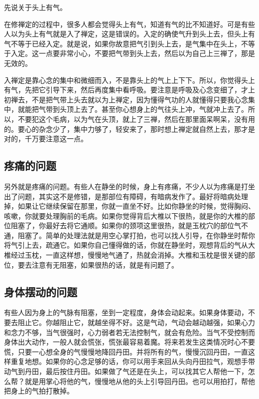 \documentclass{book}
\begin{document}
先说关于头上有气。

在修禅定的过程中，很多人都会觉得头上有气，知道有气的比不知道好。可是有些人以为头上有气就是入了禅定，这是错误的。入定的确使气升到头上去，但头上有气不等于已经入定。就是说，如果你故意把气引到头上去，是气集中在头上，不等于入定。这一点要非常小心，不要把气带到头上去，然后以为自己上三禅了，那是无效的。

入禅定是靠心念的集中和微细而入，不是靠头上的气上上下下。所以，你觉得头上有气，先把它引导下来，然后再度集中看呼吸。要注意是呼吸及心念变细了，才上初禅去，不是把气带上头去就以为上禅定，因为懂得气功的人就懂得只要我心念集中，就能把气带到头顶上去了。甚至你心想身上的气往头上冲，气就冲上去了。所以，不要犯这个毛病，以为气在头顶，就上了三禅，然后在那里面呆啊呆，没有用的。要心的杂念少了，集中力够了，轻安来了，那时想上禅定就自然上去，那才是对的，千万要注意这一点。

\subsection{疼痛的问题}

另外就是疼痛的问题。有些人在静坐的时候，身上有疼痛，不少人以为疼痛是打坐出了问题，其实这不是修错，是那部位有障碍，有暗病发作了。最好将暗病处理掉，如果让它继续保留在那里，你就一直坐不好。比如你静坐的时候，觉得胸闷、咳嗽，你就要处理胸前的毛病。如果你觉得背后大椎以下很热，就是你的大椎的部位阻塞了，你最好去将它通顺。如果你的颈项这里很热，就是玉枕穴的部位气不通，阻塞了。简单的处理法就是用空心掌打拍，也可以找人引导，在你静坐时帮你将气引上去，疏通它。如果你自己懂得做的话，你就在静坐时，观想背后的气从大椎经过玉枕，一直这样想，慢慢地气通了，热就会消掉。大椎和玉枕是很关键的部位，要去注意有无阻塞，如果很热的话，就是有问题了。

\subsection{身体摆动的问题}

有些人因为身上的气脉有阻塞，坐到一定程度，身体会动起来。如果身体要动，不要去阻止它。你越阻止它，就越坐得不好。这是气动，气动会越动越强，如果心力和念力不够，当气很强时，心力弱者若无法控制气，就会有危险。当气不受控制而身体出大动作，一般人就会慌张，慌张最容易着魔。将来若发生这类情况时心不要慌，只要一心想全身的气慢慢地降回丹田。并将所有的气，慢慢沉回丹田，一直这样重复地想。如果你的心念足够的话，你可以用手来回从头向丹田拉气，观想手带动气到丹田，最后按住丹田。如果做了气还是在头上，可以找其它人帮他一下，怎么帮？就是用掌心将他的气，慢慢地从他的头上引导回丹田。也可以用拍打，帮他把身上的气拍打散掉。
\end{document}
